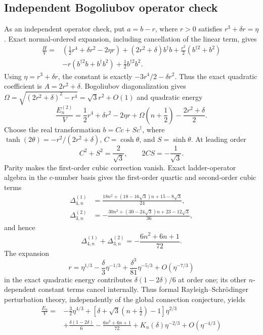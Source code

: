 \documentclass[11pt]{article}
\theoremstyle{remark}
\begin{document}
\subsection{Independent Bogoliubov operator check}

As an independent operator check, put \(a=b-r\), where
\(r>0\) satisfies \(r^3+\delta r=\eta\).  Exact normal-ordered expansion,
including cancellation of the linear term, gives
\begin{align}
 \frac HV={}&\left(\frac12r^4+\delta r^2-2\eta r\right)
 +(2r^2+\delta)b^\dagger b
 +\frac{r^2}{2}(b^{\dagger2}+b^2)\nonumber\\
 &-r(b^{\dagger2}b+b^\dagger b^2)+\frac12b^{\dagger2}b^2.
 \label{eq:shifted-hamiltonian}
\end{align}
Using \(\eta=r^3+\delta r\), the constant is exactly
\(-3r^4/2-\delta r^2\).
Thus the exact quadratic coefficient is \(A=2r^2+\delta\).  Bogoliubov
diagonalization gives
\(\Omega=\sqrt{(2r^2+\delta)^2-r^4}=\sqrt3r^2+O(1)\) and quadratic energy
\begin{equation}
 \frac{E_n^{(2)}}V=\frac12r^4+\delta r^2-2\eta r
 +\Omega\left(n+\frac12\right)-\frac{2r^2+\delta}{2}.
\end{equation}
Choose the real transformation \(b=Cc+Sc^\dagger\), where
\(\tanh(2\theta)=-r^2/(2r^2+\delta)\), \(C=\cosh\theta\), and
\(S=\sinh\theta\).  At leading order
\[
 C^2+S^2=\frac2{\sqrt3},\qquad 2CS=-\frac1{\sqrt3}.
\]
Parity makes the first-order cubic correction vanish.  Exact ladder-operator
algebra in the \(c\)-number basis gives the first-order quartic and
second-order cubic terms
\begin{align}
 \Delta_{4,n}^{(1)}&=
 \frac{18n^2+(18-16\sqrt3)n+15-8\sqrt3}{24},\nonumber\\
 \Delta_{3,n}^{(2)}&=-
 \frac{30n^2+(30-24\sqrt3)n+23-12\sqrt3}{36},
 \label{eq:cubic-quartic-constant}
\end{align}
and hence
\begin{equation}
 \Delta_{4,n}^{(1)}+\Delta_{3,n}^{(2)}
 =-\frac{6n^2+6n+1}{72}.
\end{equation}
The expansion
\[
 r=\eta^{1/3}-\frac{\delta}{3}\eta^{-1/3}
 +\frac{\delta^3}{81}\eta^{-5/3}+O(\eta^{-7/3})
\]
in the exact quadratic energy contributes
\(\delta(1-2\delta)/6\) at order one; its other \(n\)-dependent constant
terms cancel internally.  Thus formal Rayleigh--Schr\"odinger perturbation
theory, independently of the global connection conjecture, yields
\begin{equation}
 \boxed{\begin{aligned}
 \frac{E_n}{V}={}&-\frac32\eta^{4/3}
 +\left[\delta+\sqrt3\left(n+\frac12\right)-1\right]\eta^{2/3}\\
 &+\frac{\delta(1-2\delta)}6-\frac{6n^2+6n+1}{72}
 +K_n(\delta)\eta^{-2/3}+O(\eta^{-4/3})
 \end{aligned}}
 \label{eq:strong-drive-energy-constant}
\end{equation}
\end{document}
